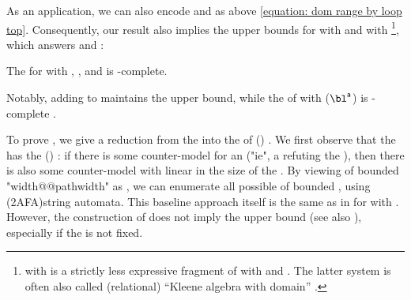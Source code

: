\begin{scope}
As an application,
we can also encode  and  as above \eqref{equation: dom range by loop top}.
Consequently, our result also implies the  upper bounds for 
 with  and  with  \cite{desharnaisInternalAxiomsDomain2011,mcleanFreeKleeneAlgebras2020,sedlarKleeneAlgebraDynamic2023}\footnote{
 with  is a strictly less expressive fragment of  with  and .
The latter system is often also called (relational) ``Kleene algebra with domain'' \cite{desharnaisKleeneAlgebraDomain2006}.},
%
which answers \cite[Problem 7.3]{mcleanFreeKleeneAlgebras2020} and \cite[p.\ 16]{sedlarKleeneAlgebraDynamic2023}:
\begin{cor}\label{corollary: KA with domain PSPACE-complete}
The 
for  with , , and  is \textup{}-complete.
\end{cor}
Notably, adding  to  maintains the  upper bound,
while the  of  with  ($\bl^{\mathsf{a}}$) is -complete \cite{sedlarComplexityKleeneAlgebra2023}.

To prove ,
we give a reduction from the  into the  of  () \cite{geffertTransformingTwoWayAlternating2014}.
We first observe that the  has the \emph{} () \cite[Proposition 2.9]{nakamuraDerivativesGraphsPositive2025}:
if there is some counter-model for an  ("ie", a  refuting the ),
then there is also some counter-model with  linear in the size of the .
By viewing  of bounded "width@@pathwidth" as ,
we can enumerate all possible  of bounded , using \kl(2AFA){string automata}.
This baseline approach itself is the same as in \cite{nakamuraDerivativesGraphsPositive2025} for  with .
However,
the construction of \cite{nakamuraDerivativesGraphsPositive2025} does not imply the  upper bound (see also \cite[p.~46--47]{nakamuraDerivativesGraphsPositive2025}), especially if the  is not fixed.


\end{scope}

